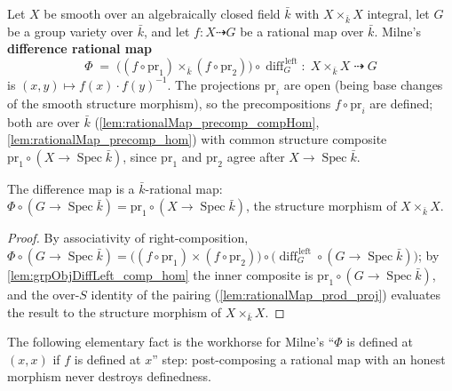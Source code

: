 \begin{definition}\leanok
  \label{def:rationalMap_difference}
  Let \(X\) be smooth over an algebraically closed field \(\bar k\) with \(X \times_{\bar k} X\)
  integral, let \(G\) be a group variety over \(\bar k\), and let
  \(f \colon X \dashrightarrow G\) be a rational map over \(\bar k\). Milne's
  \textbf{difference rational map}
  \[
    \Phi \;=\; \bigl((f \circ \mathrm{pr}_1) \times_{\bar k} (f \circ \mathrm{pr}_2)\bigr)
    \circ \operatorname{diff}_G^{\,\mathrm{left}}
    \colon\; X \times_{\bar k} X \;\dashrightarrow\; G
  \]
  is \((x,y) \mapsto f(x) \cdot f(y)^{-1}\). The projections \(\mathrm{pr}_i\) are open (being
  base changes of the smooth structure morphism), so the precompositions
  \(f \circ \mathrm{pr}_i\) are defined; both are over \(\bar k\)
  (\cref{lem:rationalMap_precomp_compHom}, \cref{lem:rationalMap_precomp_hom}) with common
  structure composite \(\mathrm{pr}_1 \circ (X \to \operatorname{Spec}\bar k)\), since
  \(\mathrm{pr}_1\) and \(\mathrm{pr}_2\) agree after \(X \to \operatorname{Spec}\bar k\).
\end{definition}

\begin{lemma}\leanok
  \label{lem:rationalMap_difference_over}
  The difference map is a \(\bar k\)-rational map: \(\Phi \circ (G \to \operatorname{Spec}\bar k)
  = \mathrm{pr}_1 \circ (X \to \operatorname{Spec}\bar k)\), the structure morphism of
  \(X \times_{\bar k} X\).
\end{lemma}
\begin{proof}\leanok
  By associativity of right-composition, \(\Phi \circ (G \to \operatorname{Spec}\bar k) =
  \bigl((f \circ \mathrm{pr}_1) \times (f \circ \mathrm{pr}_2)\bigr) \circ
  \bigl(\operatorname{diff}_G^{\,\mathrm{left}} \circ (G \to \operatorname{Spec}\bar k)\bigr)\);
  by \cref{lem:grpObjDiffLeft_comp_hom} the inner composite is
  \(\mathrm{pr}_1 \circ (G \to \operatorname{Spec}\bar k)\), and the over-\(S\) identity of the
  pairing (\cref{lem:rationalMap_prod_proj}) evaluates the result to the structure morphism of
  \(X \times_{\bar k} X\).
\end{proof}

The following elementary fact is the workhorse for Milne's ``\(\Phi\) is defined at
\((x,x)\) if \(f\) is defined at \(x\)'' step: post-composing a rational map with an
honest morphism never destroys definedness.

